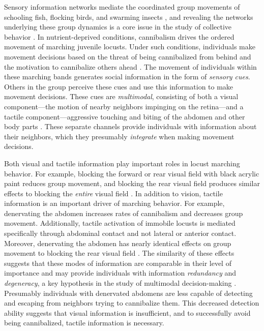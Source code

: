 \documentclass[11pt,a4paper,oneside]{article}
\begin{document}
	Sensory information networks mediate the coordinated group movements of schooling fish, flocking birds, and swarming insects \citep{couzin2007collective,bazazi2008collective,strandburg2013visual,strandburg2017habitat,rosenthal2015network}, and revealing the networks underlying these group dynamics is a core issue in the study of collective behavior \citep{croft2008exploring,couzin2007collective}. In nutrient-deprived conditions, cannibalism drives the ordered movement of marching juvenile locusts. Under such conditions, individuals make movement decisions based on the threat of being cannibalized from behind and the motivation to cannibalize others ahead \citep{bazazi2008collective,romanczuk2009collective,bazazi2011nutritional,guttal2012cannibalism}. The movement of individuals within these marching bands generates social information in the form of \textit{sensory cues}. Others in the group perceive these cues and use this information to make movement decisions. These cues are \textit{multimodal}, consisting of both a visual component---the motion of nearby neighbors impinging on the retina---and a tactile component---aggressive touching and biting of the abdomen and other body parts \citep{bazazi2008collective}. These separate channels provide individuals with information about their neighbors, which they presumably \textit{integrate} when making movement decisions. 
	\par
	Both visual and tactile information play important roles in locust marching behavior. For example, blocking the forward or rear visual field with black acrylic paint reduces group movement, and blocking the rear visual field produces similar effects to blocking the \textit{entire} visual field \citep{bazazi2008collective}. In addition to vision, tactile information is an important driver of marching behavior. For example, denervating the abdomen increases rates of cannibalism and decreases group movement. Additionally, tactile activation of immobile locusts is mediated specifically through abdominal contact and  not lateral or anterior contact. Moreover, denervating the abdomen has nearly identical effects on group movement to blocking the rear visual field \citep{bazazi2008collective}. The similarity of these effects suggests that these modes of information are comparable in their level of importance and may provide individuals with information \textit{redundancy} and \textit{degeneracy}, a key hypothesis in the study of multimodal decision-making \citep{hebets2016systems,stein2012new}. Presumably individuals with denervated abdomens are less capable of detecting and escaping from neighbors trying to cannibalize them. This decreased detection ability suggests that visual information is insufficient, and to successfully avoid being cannibalized, tactile information is necessary.
\end{document}
